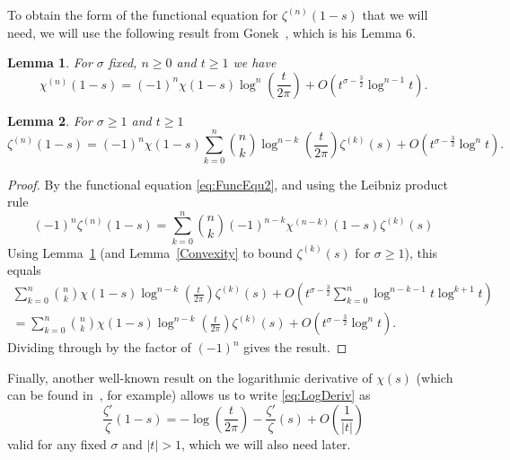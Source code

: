\documentclass[12pt,a4paper,reqno]{amsart}
\newtheorem{lemma}{Lemma}
\theoremstyle{remark}
\numberwithin{equation}{section}
\begin{document}
To obtain the form of the functional equation for $\zeta ^{(n)} (1-s)$ that we will need, we will use the following result from Gonek~\cite{Gonek}, which is his Lemma 6.

\begin{lemma} \label{Gonek Lemma 6}
For $\sigma$ fixed, $n \geq 0$ and $t \geq 1$ we have
\[
\chi^{(n)} (1-s) = (-1)^n \chi (1-s) \log^n \left( \frac{t}{2 \pi} \right) + O (t^{\sigma -\frac{3}{2}} \log^{n-1} t).
\]
\end{lemma}

\begin{lemma}\label{functional zeta(1-s)}
For $\sigma \geq 1$ and $t\geq 1$
\[
\zeta ^{(n)} (1-s) = (-1)^n \chi (1-s) \sum_{k=0}^n \binom{n}{k} \log^{n-k} \left(\frac{t}{2 \pi} \right) \zeta^{(k)} (s) + O(t^{\sigma - \frac{3}{2}} \log^{n} t).
\]
\end{lemma}

\begin{proof}
By the functional equation \eqref{eq:FuncEqu2}, and using the Leibniz product rule 
\begin{equation*}
(-1)^n \zeta^{(n)} (1-s)  = \sum_{k=0}^n \binom{n}{k} (-1)^{n-k} \chi^{(n-k)} (1-s) \zeta^{(k)} (s) 
\end{equation*}
Using Lemma~\ref{Gonek Lemma 6} (and Lemma~\ref{Convexity} to bound $\zeta^{(k)}(s)$ for $\sigma\geq 1$), this equals
\begin{multline*}
\sum_{k=0}^n \binom{n}{k} \chi (1-s)  \log^{n-k} \left( \frac{t}{2 \pi} \right) \zeta^{(k)} (s) + O\left(t^{\sigma - \frac{3}{2}}  \sum_{k=0}^n \log^{n-k-1} t \log^{k+1} t \right) \\
= \sum_{k=0}^n \binom{n}{k} \chi (1-s) \log^{n-k} \left( \frac{t}{2 \pi} \right) \zeta^{(k)} (s) + O(t^{\sigma - \frac{3}{2}} \log^{n} t).
\end{multline*}
Dividing through by the factor of $(-1)^n$ gives the result.
\end{proof}

Finally, another well-known result on the logarithmic derivative of $\chi(s)$ (which can be found in~\cite{Gonek}, for example) allows us to write \eqref{eq:LogDeriv} as
\begin{equation}
\frac{\zeta '}{\zeta} (1-s) = - \log \left(\frac{t}{2 \pi} \right) - \frac{\zeta '}{\zeta} (s) + O\left( \frac{1}{|t|} \right) \label{eq:LogDeriv2}
\end{equation}
valid for any fixed $\sigma$ and $|t|>1$, which we will also need later.
\end{document}

